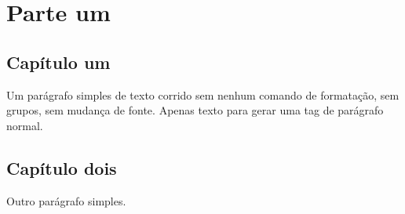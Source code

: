 \documentclass[11pt,a5paper,twoside,openany]{book}
\begin{document}
\part{Parte um}

\chapter{Capítulo um}

Um parágrafo simples de texto corrido sem nenhum comando de
formatação, sem grupos, sem mudança de fonte. Apenas texto
para gerar uma tag de parágrafo normal.

\chapter{Capítulo dois}

Outro parágrafo simples.
\end{document}
